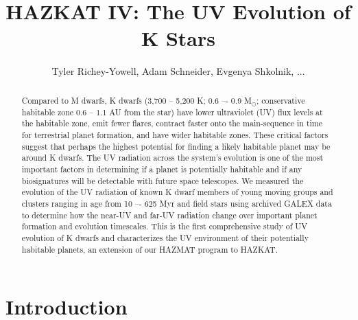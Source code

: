 \documentclass[twocolumn]{aastex62}
\begin{document}
\title{HAZKAT IV: The UV Evolution of K Stars}

\author{Tyler Richey-Yowell, Adam Schneider, Evgenya Shkolnik, ...}

\begin{abstract}

Compared to M dwarfs, K dwarfs (3,700 -- 5,200 K; 0.6 –- 0.9 M$_{\odot}$; conservative habitable zone 0.6 -- 1.1 AU from the star) have lower ultraviolet (UV) flux levels at the habitable zone, emit fewer flares, contract faster onto the main-sequence in time for terrestrial planet formation, and have wider habitable zones. These critical factors suggest that perhaps the highest potential for finding a likely habitable planet may be around K dwarfs. The UV radiation across the system’s evolution is one of the most important factors in determining if a planet is potentially habitable and if any biosignatures will be detectable with future space telescopes. We measured the evolution of the UV radiation of known K dwarf members of young moving groups and clusters ranging in age from 10 –- 625 Myr and field stars using archived GALEX data to determine how the near-UV and far-UV radiation change over important planet formation and evolution timescales. This is the first comprehensive study of UV evolution of K dwarfs and characterizes the UV environment of their potentially habitable planets, an extension of our HAZMAT program to HAZKAT.

\end{abstract}


\section{Introduction}\label{sec:intro}
\end{document}
